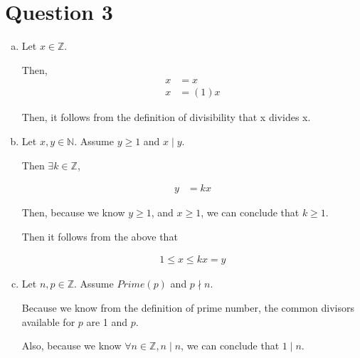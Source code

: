 \documentclass[12pt]{article}
\begin{document}
\section*{Question 3}

\begin{enumerate}[a.]
    \item

    Let $x \in \mathbb{Z}$.

    \bigskip

    Then,
    \setcounter{equation}{0}
    \begin{align}
        x &= x\\
        x &= (1)x
    \end{align}

    \bigskip

    Then, it follows from the definition of divisibility that x divides x.

    \item

    Let $x,y \in \mathbb{N}$. Assume $y \geq 1$ and $x \mid y$.

    \bigskip

    Then $\exists k \in \mathbb{Z}$,

    \setcounter{equation}{0}
    \begin{align}
        y &= kx
    \end{align}

    \bigskip

    Then, because we know $y \geq 1$, and $x \geq 1$, we can conclude that $k \geq 1$.

    \bigskip

    Then it follows from the above that

    \begin{align}
        1 \leq x \leq kx = y
    \end{align}

    \item

    Let $n,p \in \mathbb{Z}$. Assume $Prime(p)$ and $p \nmid n$.

    \bigskip

    Because we know from the definition of prime number, the common divisors
    available for $p$ are 1 and $p$.

    \bigskip

    Also, because we know $\forall n \in \mathbb{Z}, n \mid n$, we can conclude
    that $1 \mid n$.

    \bigskip


\end{enumerate}
\end{document}
